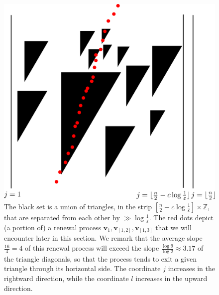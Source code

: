\documentclass[12pt,a4paper,reqno]{amsart}
\numberwithin{equation}{section}
\theoremstyle{plain}
\theoremstyle{definition}
\newcommand\Z{\mathbb{Z}}
\renewcommand\v{\mathbf{v}}
\newcommand\eps{\varepsilon}
\begin{document}
\begin{figure} [t]
\centering
\includegraphics[width=5in]{./triangles.png}
\caption{The black set is a union of triangles, in the strip $[\frac{n}{2} - c \log \frac{1}{\eps}] \times \Z$, that are separated from each other by $\gg \log \frac{1}{\eps}$.  The red dots depict (a portion of) a renewal process $\v_1, \v_{[1,2]}, \v_{[1,3]}$ that we will encounter later in this section.  We remark that the average slope $\frac{16}{4}=4$ of this renewal process will exceed the slope $\frac{\log 9}{\log 2} \approx 3.17$ of the triangle diagonals, so that the process tends to exit a given triangle through its horizontal side.  The coordinate $j$ increases in the rightward direction, while the coordinate $l$ increases in the upward direction.}
\label{fig:triangles}
\end{figure}
\end{document}
